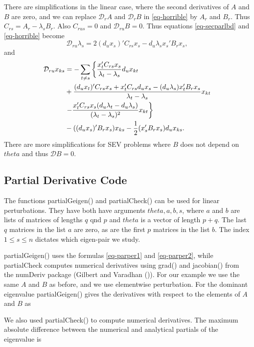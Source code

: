 \documentclass[
  12pt,
  letterpaper,
  DIV=11,
  numbers=noendperiod]{scrartcl}
\begin{document}
There are simplifications in the linear case, where the second
derivatives of \(A\) and \(B\) are zero, and we can replace
\(\mathcal{D}_rA\) and \(\mathcal{D}_rB\) in \eqref{eq-horrible} by
\(A_r\) and \(B_r\). Thus \(C_{rs}=A_r-\lambda_sB_r\). Also
\(C_{rus}=0\) and \(\mathcal{D}_{ru}B=0\). Thus equations
\eqref{eq-secparlbd} and \eqref{eq-horrible} become \begin{equation}
\mathcal{D}_{ru}\lambda_s=2(d_ux_s)'C_{rs}x_s-d_u\lambda_sx_s'B_rx_s,
\end{equation} and \begin{align}
\mathcal{D}_{ru}x_{ks}&=-\sum_{t\not= s}\left\{\frac{x_t'C_{rs}x_s}{\lambda_t-\lambda_s}d_ux_{kt}\right.\notag\\
&+\frac{(d_ux_t)'C_{rs}x_s+
x_t'C_{rs}d_ux_s-(d_u\lambda_s)x_t'B_rx_s}{\lambda_t-\lambda_s}x_{kt}\notag\\
&\left.-\frac{x_t'C_{rs}x_s(d_u\lambda_t-d_u\lambda_s)}{(\lambda_t-\lambda_s)^2}x_{kt}\right\}\notag\\
&-((d_ux_s)'B_rx_s)x_{ks}-\frac12(x_s'B_rx_s)d_ux_{ks}.
\end{align} There are more simplifications for SEV problems where \(B\)
does not depend on \(theta\) and thus \(\mathcal{D}B=0\).

\subsection{Partial Derivative Code}\label{sec-partialcode}

The functions partialGeigen() and partialCheck() can be used for linear
perturbations. They have both have arguments \(theta, a, b, s\), where
\(a\) and \(b\) are lists of matrices of lengths \(q\) qnd \(p\) and
\(theta\) is a vector of length \(p+q\). The last \(q\) matrices in the
list \(a\) are zero, as are the first \(p\) matrices in the list \(b\).
The index \(1\leq s\leq n\) dictates which eigen-pair we study.

partialGeigen() uses the formulas \eqref{eq-parper1} and
\eqref{eq-parper2}, while partialCheck computes numerical derivatives
using grad() and jacobian() from the numDeriv package (Gilbert and
Varadhan ()). For our example we
use the same \(A\) and \(B\) as before, and we use elementwise
perturbation. For the dominant eigenvalue partialGeigen() gives the
derivatives with respect to the elements of \(A\) and \(B\) as

We also used partialCheck() to compute numerical derivatives. The
maximum absolute difference between the numerical and analytical
partials of the eigenvalue is
\end{document}
